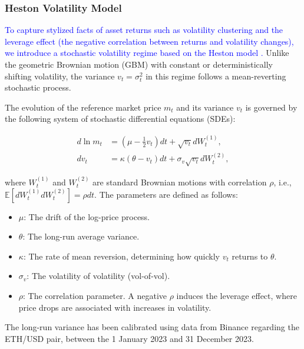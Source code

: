 \documentclass[11pt]{article}
\begin{document}
\subsubsection{Heston Volatility Model}

\textcolor{blue}{To capture stylized facts of asset returns such as volatility clustering and the leverage effect (the negative correlation 
between returns and volatility changes), we introduce a stochastic volatility regime based on the Heston model \cite{heston1993}.} Unlike the
geometric Brownian motion (GBM) with constant or deterministically shifting volatility, the variance $v_t = \sigma_t^2$ in 
this regime follows a mean-reverting stochastic process.

The evolution of the reference market price $m_t$ and its variance $v_t$ is governed by the following system of stochastic 
differential equations (SDEs):

\begin{align}
    d \ln m_t &= \left(\mu - \frac{1}{2}v_t\right)dt + \sqrt{v_t} dW_t^{(1)}, \\
    dv_t &= \kappa(\theta - v_t)dt + \sigma_v \sqrt{v_t} dW_t^{(2)},
    \label{eq:heston_dynamics}
\end{align}

where $W_t^{(1)}$ and $W_t^{(2)}$ are standard Brownian motions with correlation $\rho$, i.e., $\mathbb{E}[dW_t^{(1)} dW_t^{(2)}] = \rho dt$. The parameters are defined as follows:
\begin{itemize}
    \item $\mu$: The drift of the log-price process.
    \item $\theta$: The long-run average variance.
    \item $\kappa$: The rate of mean reversion, determining how quickly $v_t$ returns to $\theta$.
    \item $\sigma_v$: The volatility of volatility (vol-of-vol).
    \item $\rho$: The correlation parameter. A negative $\rho$ induces the leverage effect, where price drops are associated with increases in volatility.
\end{itemize}
The long-run variance has been calibrated using data from Binance regarding the ETH/USD pair, between the 1 January 2023 and 31 December 2023.
\end{document}
